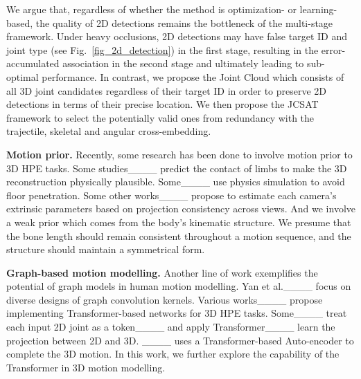 We argue that, regardless of whether the method is optimization- or learning-based, the quality of 2D detections remains the bottleneck of the multi-stage framework.
Under heavy occlusions, 2D detections may have false target ID and joint type (see Fig.~\ref{fig_2d_detection}) in the first stage, resulting in the error-accumulated association in the second stage and ultimately leading to sub-optimal performance. In contrast, we propose the Joint Cloud which consists of all 3D joint candidates regardless of their target ID in order to preserve 2D detections in terms of their precise location. We then propose the JCSAT framework to select the potentially valid ones from redundancy with the trajectile, skeletal and angular cross-embedding. 

\noindent\textbf{Motion prior.} Recently, some research has been done to involve motion prior to 3D HPE tasks. Some studies____ predict the contact of limbs to make the 3D reconstruction physically plausible. Some____ use physics simulation to avoid floor penetration. Some other works____ propose to estimate each camera's extrinsic parameters based on projection consistency across views. 
And we involve a weak prior which comes from the body's kinematic structure. We presume that the bone length should remain consistent throughout a motion sequence, and the structure should maintain a symmetrical form.

\noindent\textbf{Graph-based motion modelling.} Another line of work exemplifies the potential of graph models in human motion modelling. Yan et al.____ focus on diverse designs of graph convolution kernels. Various works____ propose implementing Transformer-based networks for 3D HPE tasks. Some____ treat each input 2D joint as a token____ and apply Transformer____  learn the projection between 2D and 3D. 
____ uses a Transformer-based Auto-encoder to complete the 3D motion.
In this work, we further explore the capability of the Transformer in 3D motion modelling. 

